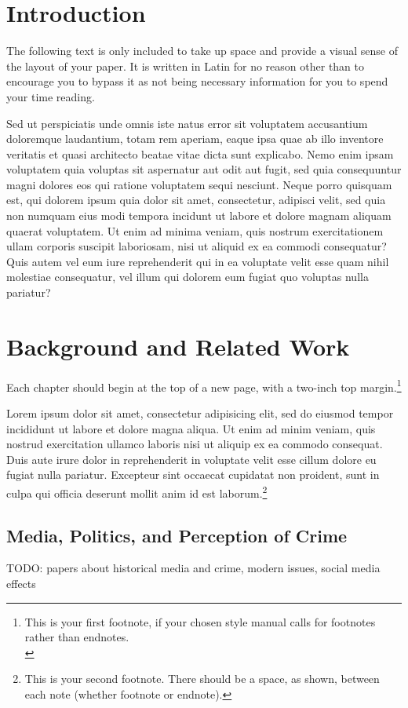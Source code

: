 \documentclass[12pt,oneside, letterpaper]{book}
\begin{document}
\chapter{Introduction}
\par The following text is only included to take up space and provide a visual sense of the layout of your paper.   It is written in Latin for no reason other than to encourage you to bypass it as not being necessary information for you to spend your time reading.  
\par Sed ut perspiciatis unde omnis iste natus error sit voluptatem accusantium doloremque laudantium, totam rem aperiam, eaque ipsa quae ab illo inventore veritatis et quasi architecto beatae vitae dicta sunt explicabo. Nemo enim ipsam voluptatem quia voluptas sit aspernatur aut odit aut fugit, sed quia consequuntur magni dolores eos qui ratione voluptatem sequi nesciunt. Neque porro quisquam est, qui dolorem ipsum quia dolor sit amet, consectetur, adipisci velit, sed quia non numquam eius modi tempora incidunt ut labore et dolore magnam aliquam quaerat voluptatem. Ut enim ad minima veniam, quis nostrum exercitationem ullam corporis suscipit laboriosam, nisi ut aliquid ex ea commodi consequatur? Quis autem vel eum iure reprehenderit qui in ea voluptate velit esse quam nihil molestiae consequatur, vel illum qui dolorem eum fugiat quo voluptas nulla pariatur?

\chapter{Background and Related Work}
\par Each chapter should begin at the top of a new page, with a two-inch top margin.\footnote{This is your first footnote, if your chosen style manual calls for footnotes rather than endnotes. \\} 
\par Lorem ipsum dolor sit amet, consectetur adipisicing elit, sed do eiusmod tempor incididunt ut labore et dolore magna aliqua. Ut enim ad minim veniam, quis nostrud exercitation ullamco laboris nisi ut aliquip ex ea commodo consequat. Duis aute irure dolor in reprehenderit in voluptate velit esse cillum dolore eu fugiat nulla pariatur. Excepteur sint occaecat cupidatat non proident, sunt in culpa qui officia deserunt mollit anim id est laborum.\footnote{This is your second footnote. There should be a space, as shown, between each note (whether footnote or endnote).}

\section{Media, Politics, and Perception of Crime}
\par TODO: papers about historical media and crime, modern issues, social media effects
\end{document}
